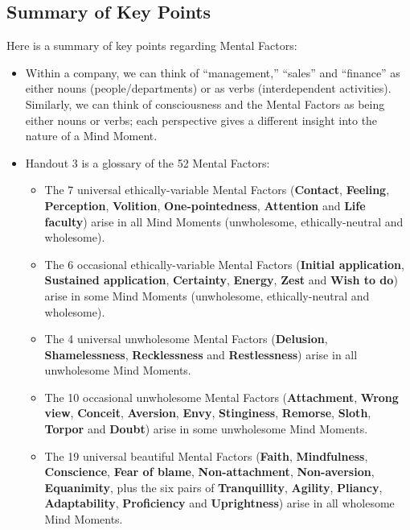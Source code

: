 \subsection*{Summary of Key Points}

Here is a summary of key points regarding Mental Factors:

\begin{itemize}

\item Within a company, we can think of “management,” “sales” and “finance” as either nouns (people/departments) or as verbs (interdependent activities). Similarly, we can think of consciousness and the Mental Factors as being either nouns or verbs; each perspective gives a different insight into the nature of a Mind Moment.

\item Handout 3 is a glossary of the 52 Mental Factors:

\begin{itemize}

\item The 7 universal ethically-variable Mental Factors (\textbf{Contact}, \textbf{Feeling}, \textbf{Perception}, \textbf{Volition}, \textbf{One-pointedness}, \textbf{Attention} and \textbf{Life faculty}) arise in all Mind Moments (unwholesome, ethically-neutral and wholesome).

\item The 6 occasional ethically-variable Mental Factors (\textbf{Initial application}, \textbf{Sustained application}, \textbf{Certainty}, \textbf{Energy}, \textbf{Zest} and \textbf{Wish to do}) arise in some Mind Moments (unwholesome, ethically-neutral and wholesome).

\item The 4 universal unwholesome Mental Factors (\textbf{Delusion}, \textbf{Shamelessness}, \textbf{Recklessness} and \textbf{Restlessness}) arise in all unwholesome Mind Moments.

\item The 10 occasional unwholesome Mental Factors (\textbf{Attachment}, \textbf{Wrong view}, \textbf{Conceit}, \textbf{Aversion}, \textbf{Envy}, \textbf{Stinginess}, \textbf{Remorse}, \textbf{Sloth}, \textbf{Torpor} and \textbf{Doubt}) arise in some unwholesome Mind Moments.

\item The 19 universal beautiful Mental Factors (\textbf{Faith}, \textbf{Mindfulness}, \textbf{Conscience}, \textbf{Fear of blame}, \textbf{Non-attachment}, \textbf{Non-aversion}, \textbf{Equanimity}, plus the six pairs of \textbf{Tranquillity}, \textbf{Agility}, \textbf{Pliancy}, \textbf{Adaptability}, \textbf{Proficiency} and \textbf{Uprightness}) arise in all wholesome Mind Moments.


\end{itemize}
\end{itemize}
